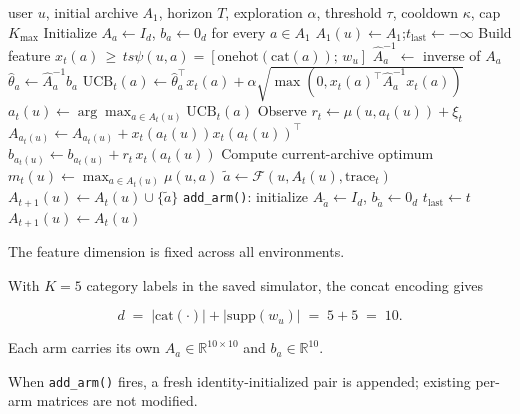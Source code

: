 \documentclass{article} %
\begin{document}
\begin{algorithm}[h]
\caption{Disjoint LinUCB with growing arm set (per-user)}
\label{alg:disjoint-linucb}
\begin{algorithmic}[1]
\Require user $u$, initial archive $A_1$, horizon $T$, exploration $\alpha$, threshold $\tau$, cooldown $\kappa$, cap $K_{\max}$
\State Initialize $A_a \gets I_d$, $b_a \gets 0_d$ for every $a \in A_1$
\State $A_1(u) \gets A_1$;\quad $t_{\text{last}} \gets -\infty$
        \State Build feature $x_t(a) \,\ge\,ts \psi(u, a) = [\mathrm{onehot}(\mathrm{cat}(a));\, w_u]$
        \State $\widehat{A}_a^{-1} \gets$ inverse of $A_a$
        \State $\hat\theta_a \gets \widehat{A}_a^{-1} b_a$
        \State $\mathrm{UCB}_t(a) \gets \hat\theta_a^\top x_t(a) + \alpha \sqrt{\max(0, x_t(a)^\top \widehat{A}_a^{-1} x_t(a))}$
    \EndFor
    \State $a_t(u) \gets \arg\max_{a \in A_t(u)} \mathrm{UCB}_t(a)$
    \State Observe $r_t \gets \mu(u, a_t(u)) + \xi_t$
    \State $A_{a_t(u)} \gets A_{a_t(u)} + x_t(a_t(u)) x_t(a_t(u))^\top$
    \State $b_{a_t(u)} \gets b_{a_t(u)} + r_t \, x_t(a_t(u))$
    \State Compute current-archive optimum $m_t(u) \gets \max_{a \in A_t(u)} \mu(u, a)$
        \State $\tilde a \gets \mathcal{F}(u, A_t(u), \text{trace}_t)$ 
        \State $A_{t+1}(u) \gets A_t(u) \cup \{\tilde a\}$
        \State \texttt{add\_arm()}: initialize $A_{\tilde a} \gets I_d$, $b_{\tilde a} \gets 0_d$
        \State $t_{\text{last}} \gets t$
    \Else
        \State $A_{t+1}(u) \gets A_t(u)$
    \EndIf
\EndFor
\end{algorithmic}
\end{algorithm}

The feature dimension is fixed across all environments.

With $K=5$ category labels in the saved simulator, the concat encoding gives

\begin{equation}
\label{eq:app-impl-d}
d \;=\; |\mathrm{cat}(\cdot)| + |\mathrm{supp}(w_u)| \;=\; 5 + 5 \;=\; 10.
\end{equation}

Each arm carries its own $A_a \in \mathbb{R}^{10\times 10}$ and $b_a \in \mathbb{R}^{10}$.

When \texttt{add\_arm()} fires, a fresh identity-initialized pair is appended; existing per-arm matrices are not modified.
\end{document}
